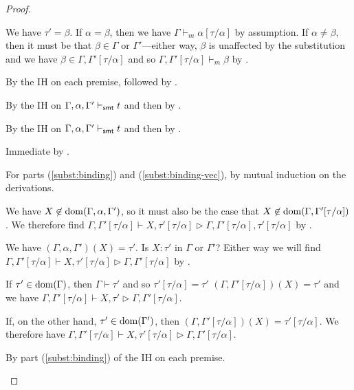 \documentclass[acmsmall,screen,nonacm]{acmart}
\theoremstyle{definition}
\begin{document}
\begin{lemma}
\begin{proof}
\begin{proofcases}
\item[(\rn{$t$-TVar})] We have $\tau' = \beta$. If $\alpha = \beta$, then we have $\Gamma \vdash_m \alpha[\tau/\alpha]$ by assumption. If $\alpha \ne \beta$, then it must be that $\beta \in \Gamma$ or $\Gamma'$---either way, $\beta$ is unaffected by the substitution and we have $\beta \in \Gamma,\Gamma'[\tau/\alpha]$ and so $\Gamma,\Gamma'[\tau/\alpha] \vdash_m \beta$ by .

\item[(\rn{$t$-ADT})] By the IH on each premise, followed by .

\item[(\rn{$\tau$-SMT})] By the IH on $\Gamma,\alpha,\Gamma' \vdash_{\mathsf{smt}} t$ and then by .

\item[(\rn{$\tau$-Sym})] By the IH on $\Gamma,\alpha,\Gamma' \vdash_{\mathsf{smt}} t$ and then by .

\item[(\rn{$\tau$-Model})] Immediate by .

\end{proofcases}

  For parts (\ref{subst:binding}) and (\ref{subst:binding-vec}), by
  mutual induction on the derivations.
%
\begin{proofcases}

\item[(\rn{$X\tau$-Bind})] We have $X \not\in \mathrm{dom}(\Gamma,\alpha,\Gamma')$, so it must also be the case that $X \not\in \mathrm{dom}(\Gamma,\Gamma'[\tau/\alpha])$. We therefore find $\Gamma,\Gamma'[\tau/\alpha] \vdash X, \tau'[\tau/\alpha] \rhd \Gamma,\Gamma'[\tau/\alpha],\tau'[\tau/\alpha]$ by .

\item[(\rn{$X\tau$-Check})] We have $(\Gamma,\alpha,\Gamma')(X) = \tau'$. Is $X:\tau'$ in $\Gamma$ or $\Gamma'$? Either way we will find $\Gamma,\Gamma'[\tau/\alpha] \vdash X,\tau'[\tau/\alpha] \rhd \Gamma,\Gamma'[\tau/\alpha]$ by .

If $\tau' \in \mathrm{dom}(\Gamma)$, then $\Gamma \vdash \tau'$ and so
$\tau'[\tau/\alpha] = \tau'$ $(\Gamma,\Gamma'[\tau/\alpha])(X)
= \tau'$ and we have $\Gamma,\Gamma'[\tau/\alpha] \vdash
X, \tau' \rhd \Gamma,\Gamma'[\tau/\alpha]$.

If, on the other hand, $\tau' \in \mathrm{dom}(\Gamma')$, then
$(\Gamma,\Gamma'[\tau/\alpha])(X) = \tau'[\tau/\alpha]$. We therefore
have $\Gamma,\Gamma'[\tau/\alpha] \vdash
X, \tau'[\tau/\alpha] \rhd \Gamma,\Gamma'[\tau/\alpha]$.

\item[(\rn{$\vec{X}\vec{\tau}$-All})] By part (\ref{subst:binding}) of the IH on each premise.
%
\qedhere

\end{proofcases}
\end{proof}
\end{lemma}
\end{document}
